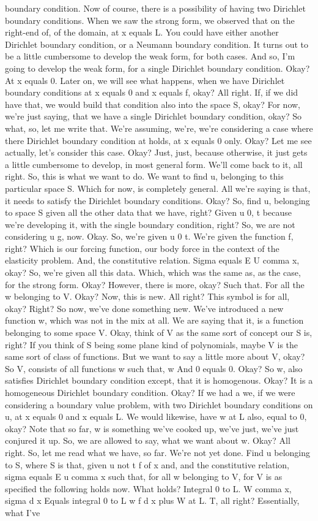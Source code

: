 \documentclass[10pt]{article}
\begin{document}
boundary condition. Now of course, there is a possibility of having two Dirichlet boundary conditions. When we saw the strong form, we observed that on the right-end of, of the domain, at x equals L. You could have either another Dirichlet boundary condition, or a Neumann boundary condition. It turns out to be a little cumbersome to develop the weak form, for both cases. And so, I'm going to develop the weak form, for a single Dirichlet boundary condition. Okay? At x equals 0. Later on, we will see what happens, when we have Dirichlet boundary conditions at x equals 0 and x equals f, okay? All right. If, if we did have that, we would build that condition also into the space S, okay? For now, we're just saying, that we have a single Dirichlet boundary condition, okay? So what, so, let me write that. We're assuming, we're, we're considering a case where there Dirichlet boundary condition at holds, at x equals 0 only. Okay? Let me see actually, let's consider this case. Okay? Just, just, because otherwise, it just gets a little cumbersome to develop, in most general form. We'll come back to it, all right. So, this is what  we want to do. We want to find u, belonging to this particular space S. Which for now, is completely general. All we're saying is that, it needs to satisfy the Dirichlet boundary conditions. Okay? So, find u, belonging to space S given all the other data that we have, right? Given u 0, t because we're developing it, with the single boundary condition, right? So, we are not considering u g, now. Okay. So, we're given u 0 t. We're given the function f, right? Which is our forcing function, our body force in the context of the elasticity problem. And, the constitutive relation. Sigma equals E U comma x, okay? So, we're given all this data. Which, which was the same as, as the case, for the strong form. Okay? However, there is more, okay? Such that. For all the w belonging to V. Okay? Now, this is new. All right? This symbol is for all, okay? Right? So now, we've done something new. We've introduced a new function w, which was not in the mix at all. We are saying that it, is a function belonging to some space V. Okay, think of V as the same sort of concept our S is, right? If you think of S being some plane kind of polynomials, maybe V is the same sort of class of functions. But we want to say a little more about V, okay? So V, consists of all functions w such that, w And 0 equals 0. Okay? So w, also satisfies Dirichlet boundary condition except, that it is homogenous. Okay? It is a homogeneous Dirichlet boundary condition. Okay? If we had a we, if we were considering a boundary value problem, with two Dirichlet boundary conditions on u, at x equals 0 and x equals L. We would likewise, have w at L also, equal to 0, okay? Note that so far, w is something we've cooked up, we've just, we've just conjured it up. So, we are allowed to say, what we want about w. Okay? All right. So, let me read what we have, so far. We're not yet done. Find u belonging to S, where S is that, given u not t f of x and, and the constitutive relation, sigma equals E u comma x such that, for all w belonging to V, for V is as specified the following holds now.  What holds? Integral 0 to L. W comma x, sigma d x Equals integral 0 to L w f d x plus W at L. T, all right? Essentially, what I've 
\end{document}
